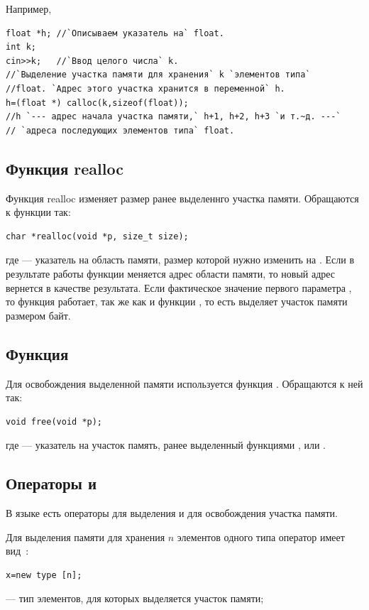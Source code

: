 Например,
\begin{lstlisting}
float *h; //`Описываем указатель на` float.
int k;
cin>>k;   //`Ввод целого числа` k.
//`Выделение участка памяти для хранения` k `элементов типа`
//float. `Адрес этого участка хранится в переменной` h.
h=(float *) calloc(k,sizeof(float));
//h `--- адрес начала участка памяти,` h+1, h+2, h+3 `и т.~д. ---`
// `адреса последующих элементов типа` float.
\end{lstlisting}

\subsection[Функция realloc]{Функция realloc}
Функция realloc изменяет размер ранее выделеннго участка памяти. Обращаются к функции так:
\begin{lstlisting}
char *realloc(void *p, size_t size);
\end{lstlisting}
где  --- указатель на область памяти, размер которой нужно изменить на . Если в
результате работы функции меняется адрес области памяти, то новый адрес вернется в качестве результата. Если
фактическое значение первого параметра , то функция  работает, так же
как и функции , то есть выделяет участок памяти размером  байт.

\subsection[Функция free]{Функция }
Для освобождения выделенной памяти используется функция . Обращаются к ней так:
\begin{lstlisting}
void free(void *p);
\end{lstlisting}
где  --- указатель на участок память, ранее выделенный функциями ,
 или .

\subsection[Операторы new и delete]{Операторы  и }
В языке  есть операторы  для выделения и
 для освобождения участка памяти.

Для выделения памяти для хранения $n$ элементов одного типа оператор  имеет вид~\cite{OOP}:%
\begin{lstlisting}
x=new type [n];
\end{lstlisting}
 --- тип элементов, для которых выделяется участок памяти;

